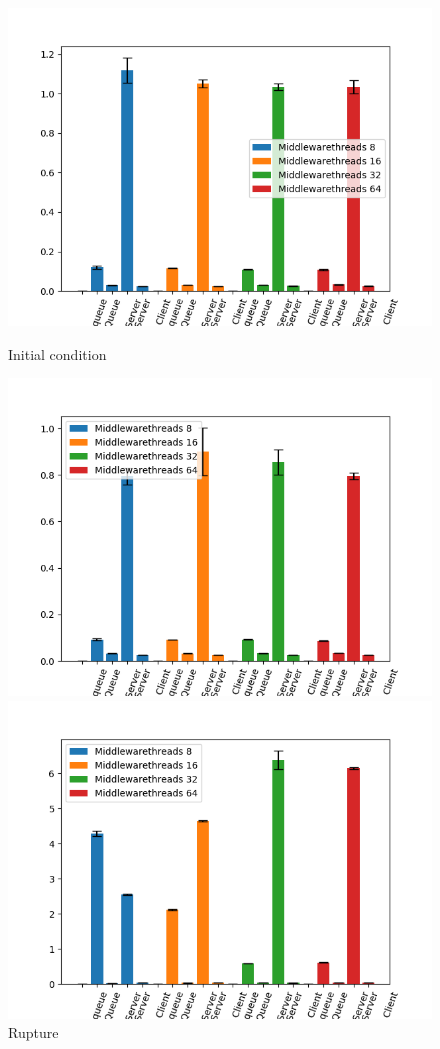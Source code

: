 \documentclass[11pt,a4paper]{article}
\begin{document}

\begin{figure}[!ht] 
  \label{ fig7} 
  \begin{minipage}[b]{0.5\linewidth}
    \centering
    \includegraphics[width=0.7\linewidth]{img/exp3_1/exp3_1_mw_percentile_plots_writes_0__vc_1.png} 
    \caption{Initial condition} 
    \vspace{4ex}
  \end{minipage}%
  \begin{minipage}[b]{0.5\linewidth}
    \centering
    \includegraphics[width=0.7\linewidth]{img/exp3_1/exp3_1_mw_percentile_plots_writes_1__vc_1.png} 
    \caption{Rupture} 
    \vspace{4ex}
  \end{minipage} 
  \begin{minipage}[b]{0.5\linewidth}
    \centering
    \includegraphics[width=0.7\linewidth]{img/exp3_1/exp3_1_mw_percentile_plots_writes_0__vc_4.png} 

\end{minipage}
\end{figure}
\end{document}
